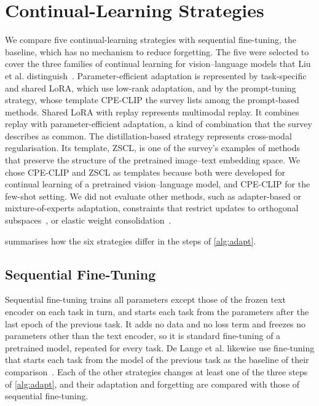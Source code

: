 \section{Continual-Learning Strategies}
\label{sec:method-strategies}

We compare five continual-learning strategies with sequential fine-tuning, the baseline, which has no mechanism to reduce forgetting.
The five were selected to cover the three families of continual learning for vision--language models that Liu et al. distinguish~\cite[Sec.~4]{liu2026continuallearningvlmssurvey}.
Parameter-efficient adaptation is represented by task-specific and shared LoRA, which use low-rank adaptation, and by the prompt-tuning strategy, whose template CPE-CLIP the survey lists among the prompt-based methods.
Shared LoRA with replay represents multimodal replay.
It combines replay with parameter-efficient adaptation, a kind of combination that the survey describes as common.
The distillation-based strategy represents cross-modal regularisation.
Its template, ZSCL, is one of the survey's examples of methods that preserve the structure of the pretrained image--text embedding space.
We chose CPE-CLIP and ZSCL as templates because both were developed for continual learning of a pretrained vision--language model, and CPE-CLIP for the few-shot setting.
We did not evaluate other methods, such as adapter-based or mixture-of-experts adaptation, constraints that restrict updates to orthogonal subspaces~\cite[Sec.~4]{liu2026continuallearningvlmssurvey}, or elastic weight consolidation~\cite{Kirkpatrick_2017}.

 summarises how the six strategies differ in the steps of \cref{alg:adapt}.

\subsection{Sequential Fine-Tuning}
\label{subsec:method-seqft}

Sequential fine-tuning trains all parameters except those of the frozen text encoder on each task in turn, and starts each task from the parameters after the last epoch of the previous task.
It adds no data and no loss term and freezes no parameters other than the text encoder, so it is standard fine-tuning of a pretrained model, repeated for every task.
De Lange et al. likewise use fine-tuning that starts each task from the model of the previous task as the baseline of their comparison~\cite[Sec.~5]{delange2022}.
Each of the other strategies changes at least one of the three steps of \cref{alg:adapt}, and their adaptation and forgetting are compared with those of sequential fine-tuning.


